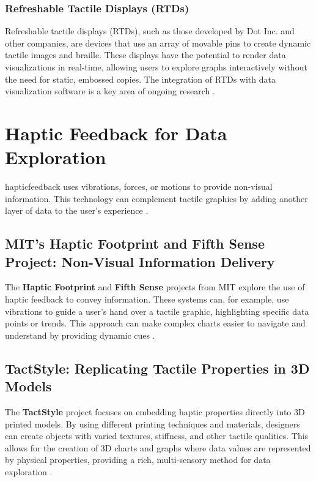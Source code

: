 \subsubsection{Refreshable Tactile Displays (RTDs)}\label{ch13:sssec:rtds}
Refreshable tactile displays (RTDs), such as those developed by Dot Inc. and other companies, are devices that use an array of movable pins to create dynamic tactile images and braille. These displays have the potential to render data visualizations in real-time, allowing users to explore graphs interactively without the need for static, embossed copies. The integration of RTDs with data visualization software is a key area of ongoing research \supercite{DotInc, OrbitGraphiti}.

\section{Haptic Feedback for Data Exploration}\label{ch13:sec:haptic-feedback}
\gls{hapticfeedback} uses vibrations, forces, or motions to provide non-visual information. This technology can complement tactile graphics by adding another layer of data to the user's experience \supercite{HapticDataViz}.

\subsection{MIT's Haptic Footprint and Fifth Sense Project: Non-Visual Information Delivery}\label{ch13:ssec:haptic-footprint}
The \textbf{Haptic Footprint} and \textbf{Fifth Sense} projects from MIT explore the use of haptic feedback to convey information. These systems can, for example, use vibrations to guide a user's hand over a tactile graphic, highlighting specific data points or trends. This approach can make complex charts easier to navigate and understand by providing dynamic cues \supercite{HapticFootprint, MITFifthSense}.

\subsection{TactStyle: Replicating Tactile Properties in 3D Models}\label{ch13:ssec:tactstyle}
The \textbf{TactStyle} project focuses on embedding haptic properties directly into 3D printed models. By using different printing techniques and materials, designers can create objects with varied textures, stiffness, and other tactile qualities. This allows for the creation of 3D charts and graphs where data values are represented by physical properties, providing a rich, multi-sensory method for data exploration \supercite{TactStyle}.

